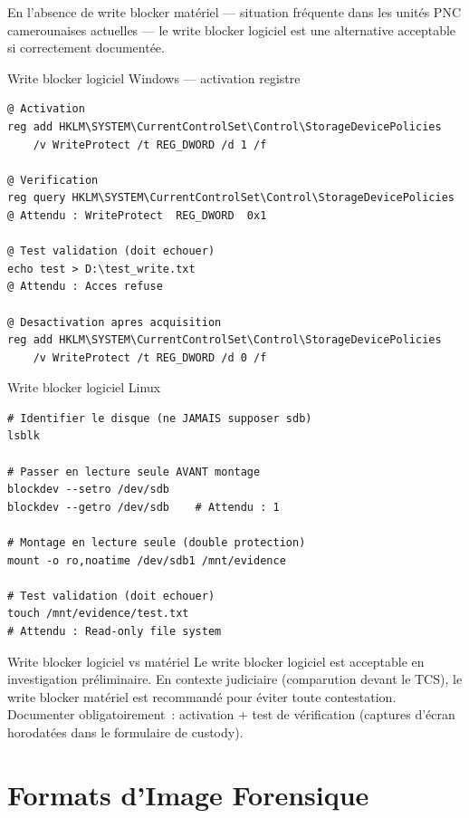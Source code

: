 En l'absence de write blocker matériel --- situation fréquente dans les
unités PNC camerounaises actuelles --- le write blocker logiciel est une
alternative acceptable si correctement documentée.

\begin{boxoutils}{Write blocker logiciel Windows --- activation registre}
\begin{lstlisting}[language=bash_forensique]
@ Activation
reg add HKLM\SYSTEM\CurrentControlSet\Control\StorageDevicePolicies
    /v WriteProtect /t REG_DWORD /d 1 /f

@ Verification
reg query HKLM\SYSTEM\CurrentControlSet\Control\StorageDevicePolicies
@ Attendu : WriteProtect  REG_DWORD  0x1

@ Test validation (doit echouer)
echo test > D:\test_write.txt
@ Attendu : Acces refuse

@ Desactivation apres acquisition
reg add HKLM\SYSTEM\CurrentControlSet\Control\StorageDevicePolicies
    /v WriteProtect /t REG_DWORD /d 0 /f
\end{lstlisting}
\end{boxoutils}

\begin{boxoutils}{Write blocker logiciel Linux}
\begin{lstlisting}[language=bash_forensique]
# Identifier le disque (ne JAMAIS supposer sdb)
lsblk

# Passer en lecture seule AVANT montage
blockdev --setro /dev/sdb
blockdev --getro /dev/sdb    # Attendu : 1

# Montage en lecture seule (double protection)
mount -o ro,noatime /dev/sdb1 /mnt/evidence

# Test validation (doit echouer)
touch /mnt/evidence/test.txt
# Attendu : Read-only file system
\end{lstlisting}
\end{boxoutils}

\begin{boiteRemarque}{Write blocker logiciel vs matériel}
Le write blocker logiciel est acceptable en investigation préliminaire.
En contexte judiciaire (comparution devant le TCS), le write blocker
matériel est recommandé pour éviter toute contestation. Documenter
obligatoirement~: activation + test de vérification (captures d'écran
horodatées dans le formulaire de custody).
\end{boiteRemarque}

\section{Formats d'Image Forensique}
\label{sec:formats-image}

